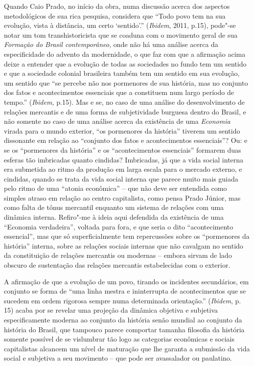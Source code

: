 {Quando Caio Prado, no início da obra, numa discussão acerca dos aspectos
metodológicos de sua rica pesquisa, considera que ``Todo povo tem na sua
evolução, vista à distância, um certo `sentido'.'' (\emph{Ibidem}, 2011,
p.15), pode"-se notar um tom transhistoricista que se coaduna com o
movimento geral de sua \emph{Formação do Brasil contemporâneo,} onde não
há uma análise acerca da especificidade do advento da modernidade, o que
faz com que a afirmação acima deixe a entender que a evolução de todas
as sociedades no fundo tem um sentido e que a sociedade colonial
brasileira também tem um sentido em sua evolução, um sentido que ``se
percebe não nos pormenores de sua história, mas no conjunto dos fatos e
acontecimentos essenciais que a constituem num largo período de tempo.''
(\emph{Ibidem,} p.15). Mas e se, no caso de uma análise do
desenvolvimento de relações mercantis e de uma forma de subjetividade
burguesa dentro do Brasil, e não somente no caso de uma análise acerca
da existência de uma \emph{Economia} virada para o mundo exterior, ``os
pormenores da história'' tiverem um sentido dissonante em relação ao
``conjunto dos fatos e acontecimentos essenciais''? Ou: e se os
``pormenores da história'' e os ``acontecimentos essenciais'' formarem
duas esferas tão imbricadas quanto cindidas? Imbricadas, já que a vida
social interna era submetida ao ritmo da produção em larga escala para o
mercado externo, e cindidas, quando se trata da vida social interna que
parece muito mais guiada pelo ritmo de uma ``atonia econômica'' -- que
não deve ser entendida como simples atraso em relação ao centro
capitalista, como pensa Prado Júnior, mas como falta de tônus mercantil
enquanto um sistema de relações com uma dinâmica interna.
Refiro"-me à ideia aqui defendida da existência de uma ``Economia
verdadeira'', voltada para fora, e que seria o dito ``acontecimento
essencial'', mas que só superficialmente tem repercussões sobre os
``pormenores da história'' interna, sobre as relações sociais internas
que não cavalgam no sentido da constituição de relações mercantis ou
modernas -- embora sirvam de lado obscuro de sustentação das relações
mercantis estabelecidas com o exterior.

A afirmação de que a evolução de um povo, tirando os
incidentes secundários, em conjunto se forma de ``uma linha mestra e
ininterrupta de acontecimentos que se sucedem em ordem rigorosa sempre
numa determinada orientação.'' (\emph{Ibidem}, p. 15) acaba por se
revelar uma projeção da dinâmica objetiva e subjetiva especificamente
moderna ao conjunto da história senão mundial ao conjunto da história do
Brasil, que tampouco parece comportar tamanha filosofia da história
somente possível de se vislumbrar tão logo as categorias econômicas e
sociais capitalistas alcancem um nível de maturação que lhe garanta a
submissão da vida social e subjetiva a seu movimento -- que pode ser
avassalador ou paulatino.

}
